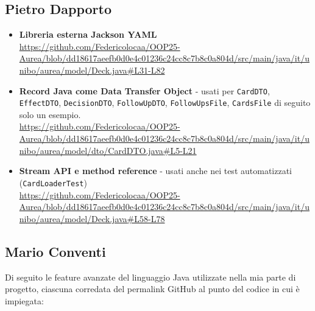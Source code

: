 \documentclass[11pt, a4paper, oneside]{report}
\begin{document}
\subsection{Pietro Dapporto}
\begin{itemize}
    \item \textbf{Libreria esterna Jackson YAML} \\
    \url{https://github.com/Federicolocaa/OOP25-Aurea/blob/dd18617aeefb0d0e4c01236c24cc8c7b8c0a804d/src/main/java/it/unibo/aurea/model/Deck.java#L31-L82}

    \item \textbf{Record Java come Data Transfer Object} - usati per \texttt{CardDTO}, \texttt{EffectDTO}, \texttt{DecisionDTO}, \texttt{FollowUpDTO}, \texttt{FollowUpsFile}, \texttt{CardsFile} di seguito solo un esempio.\\
    \url{https://github.com/Federicolocaa/OOP25-Aurea/blob/dd18617aeefb0d0e4c01236c24cc8c7b8c0a804d/src/main/java/it/unibo/aurea/model/dto/CardDTO.java#L5-L21}

    \item \textbf{Stream API e method reference} - usati anche nei test automatizzati (\texttt{CardLoaderTest}) \\
    \url{https://github.com/Federicolocaa/OOP25-Aurea/blob/dd18617aeefb0d0e4c01236c24cc8c7b8c0a804d/src/main/java/it/unibo/aurea/model/Deck.java#L58-L78}
\end{itemize}

\subsection{Mario Conventi}
Di seguito le feature avanzate del linguaggio Java utilizzate nella mia parte di progetto, ciascuna corredata del permalink GitHub al punto del codice in cui è impiegata:
\end{document}
